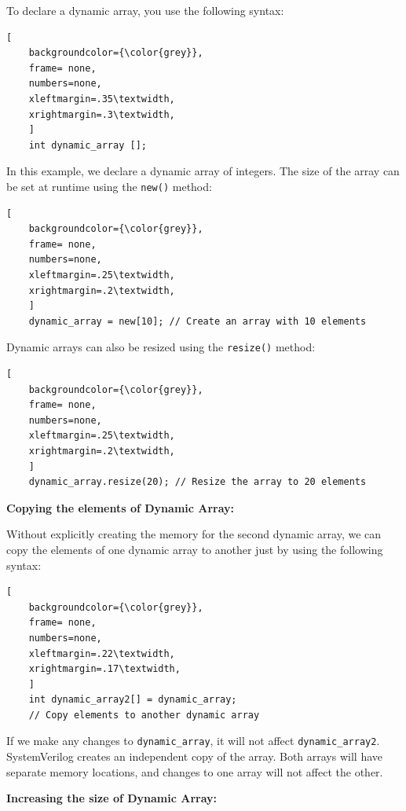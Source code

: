 \documentclass[12pt, a4paper]{article}
\begin{document}
To declare a dynamic array, you use the following syntax:

\begin{lstlisting}[
    backgroundcolor={\color{grey}},
    frame= none,
    numbers=none,
    xleftmargin=.35\textwidth,
    xrightmargin=.3\textwidth, 
    ]
    int dynamic_array [];
\end{lstlisting}

In this example, we declare a dynamic array of integers. The size of the array can be set at runtime using the \texttt{new()} method:

\begin{lstlisting}[
    backgroundcolor={\color{grey}},
    frame= none,
    numbers=none,
    xleftmargin=.25\textwidth,
    xrightmargin=.2\textwidth, 
    ]
    dynamic_array = new[10]; // Create an array with 10 elements
\end{lstlisting}

Dynamic arrays can also be resized using the \texttt{resize()} method:

\begin{lstlisting}[
    backgroundcolor={\color{grey}},
    frame= none,
    numbers=none,
    xleftmargin=.25\textwidth,
    xrightmargin=.2\textwidth, 
    ]
    dynamic_array.resize(20); // Resize the array to 20 elements
\end{lstlisting}

\vspace{1em}
\textbf{Copying the elements of Dynamic Array:}

Without explicitly creating the memory for the second dynamic array, we can copy the elements of one dynamic array to another just by using the following syntax:
\begin{lstlisting}[
    backgroundcolor={\color{grey}},
    frame= none,
    numbers=none,
    xleftmargin=.22\textwidth,
    xrightmargin=.17\textwidth, 
    ]
    int dynamic_array2[] = dynamic_array; 
    // Copy elements to another dynamic array
\end{lstlisting}

If we make any changes to \texttt{dynamic\_array}, it will not affect \texttt{dynamic\_array2}. SystemVerilog creates an independent copy of the array. Both arrays will have separate memory locations, and changes to one array will not affect the other.

\vspace{1em}

\textbf{Increasing the size of Dynamic Array:}
\end{document}
